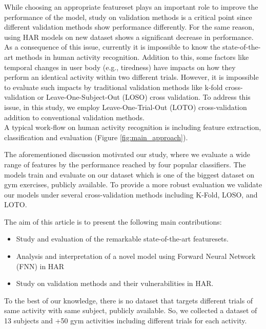 \documentclass[journal,article,submit,moreauthors,pdftex]{Definitions/mdpi}
\begin{document}
While choosing an appropriate featureset plays an important role to improve the performance of the model, study on validation methods is a critical point since different validation methods show performance differently. For the same reason, using HAR models on new dataset shows a significant decrease in performance. As a consequence of this issue, currently it is impossible to know the state-of-the-art methods in human activity recognition\cite{jordao2018human}. Addition to this, some factors like temporal changes in user body (e.g., tiredness) have impacts on how they perform an identical activity within two different trials. However, it is impossible to evaluate such impacts by traditional validation methods like k-fold cross-validation or Leave-One-Subject-Out (LOSO) cross validation. To address this issue, in this study, we employ Leave-One-Trial-Out (LOTO) cross-validation addition to conventional validation methods.\\

A typical work-flow on human activity recognition is including feature extraction, classification and evaluation (Figure \ref{fig:main_approach}).


The aforementioned discussion motivated our study, where we evaluate a wide range of features by the performance reached by four popular classifiers. The models train and evaluate on our dataset which is one of the biggest dataset on gym exercises, publicly available. To provide a more robust evaluation we validate our models under several cross-validation methods including K-Fold, LOSO, and LOTO.

The aim of this article is to present the following main contributions:
\begin{itemize}
	\item Study and evaluation of the remarkable state-of-the-art featuresets.
	\item Analysis and interpretation of a novel model using Forward Neural Network (FNN) in HAR
	\item Study on validation methods and their vulnerabilities in HAR.
\end{itemize}
To the best of our knowledge, there is no dataset that targets different trials of same activity with same subject, publicly available. So, we collected a dataset of 13 subjects and +50 gym activities including different trials for each activity.
\end{document}
